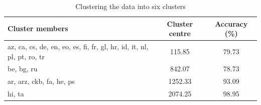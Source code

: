 \begin{table}[h]
\centering
\caption{Clustering the data into six clusters}
\label{tab:clusters}
\begin{tabular}{@{}lcc@{}}
\toprule
\textbf{Cluster members} & \textbf{Cluster centre} & \textbf{Accuracy (\%)} \\
\midrule
az, ca, cs, de, en, eo, es, fi, fr, gl, hr, id, it, nl, pl, pt, ro, tr & 115.85 & 79.73 \\
be, bg, ru & 842.07 & 78.73 \\
ar, arz, ckb, fa, he, ps & 1252.33 & 93.09 \\
hi, ta & 2074.25 & 98.95 \\
\bottomrule
\end{tabular}
\end{table}
